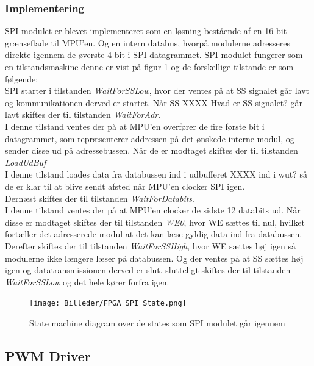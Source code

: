 \subsubsection{Implementering}
SPI modulet er blevet implementeret som en løsning bestående af en 16-bit grænseflade til MPU'en. Og en intern databus, hvorpå modulerne adresseres direkte igennem de øverste 4 bit i SPI datagrammet. SPI modulet fungerer som en tilstandsmaskine denne er vist på figur \ref{fig:FPGA_SPI_State} og de forskellige tilstande er som følgende:\\
SPI starter i tilstanden \textit{WaitForSSLow}, hvor der ventes på at SS signalet går lavt og kommunikationen derved er startet. Når SS XXXX Hvad er SS signalet? går lavt skiftes der til tilstanden \textit{WaitForAdr}. \\ 
I denne tilstand ventes der på at MPU'en overfører de fire første bit i datagrammet, som repræsenterer addressen på det ønskede interne modul, og sender disse ud på adressebussen. Når de er modtaget skiftes der til tilstanden \textit{LoadUdBuf} \\
I denne tilstand loades data fra databussen ind i udbufferet XXXX ind i wut? så de er klar til at blive sendt afsted når MPU'en clocker SPI igen.\\
Dernæst skiftes der til tilstanden \textit{WaitForDatabits}. \\
I denne tilstand ventes der på at MPU'en clocker de sidste 12 databits ud. Når disse er modtaget skiftes der til tilstanden \textit{WE0}, hvor WE sættes til nul, hvilket fortæller det adresserede modul at det kan læse gyldig data ind fra databussen. \\ Derefter skiftes der til tilstanden \textit{WaitForSSHigh}, hvor WE sættes høj igen så modulerne ikke længere læser på databussen. Og der ventes på at SS sættes høj igen og datatransmissionen derved er slut. slutteligt skiftes der til tilstanden \textit{WaitForSSLow} og det hele kører forfra igen.

\begin{figure}[ht]
	\begin{center}
		\texttt{[image: Billeder/FPGA\_SPI\_State.png]}
	\end{center}
\caption{State machine diagram over de states som SPI modulet går igennem}
\label{fig:FPGA_SPI_State}
\end{figure}

\subsection{PWM Driver}

